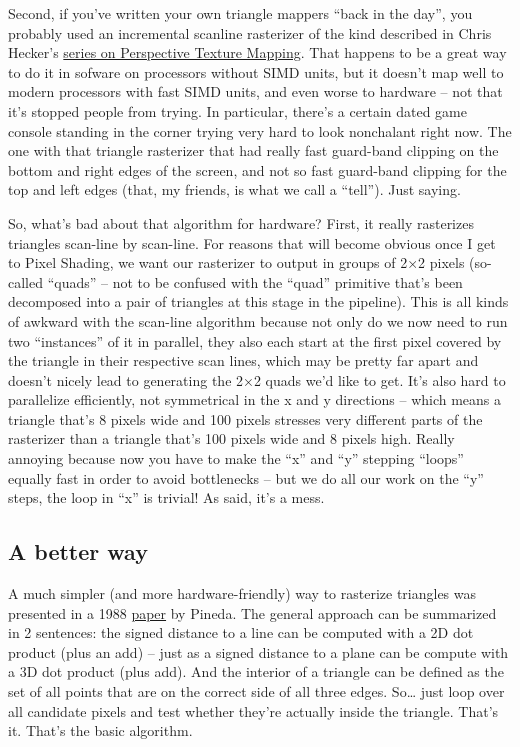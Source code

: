 \documentclass[12pt]{article}
\begin{document}
Second, if you’ve written your own triangle mappers “back in the day”, you probably used an incremental scanline rasterizer of the kind described in Chris Hecker’s \href{http://chrishecker.com/Miscellaneous\_Technical\_Articles}{series on Perspective Texture Mapping}. That happens to be a great way to do it in sofware on processors without SIMD units, but it doesn’t map well to modern processors with fast SIMD units, and even worse to hardware – not that it’s stopped people from trying. In particular, there’s a certain dated game console standing in the corner trying very hard to look nonchalant right now. The one with that triangle rasterizer that had really fast guard-band clipping on the bottom and right edges of the screen, and not so fast guard-band clipping for the top and left edges (that, my friends, is what we call a “tell”). Just saying.

So, what’s bad about that algorithm for hardware? First, it really rasterizes triangles scan-line by scan-line. For reasons that will become obvious once I get to Pixel Shading, we want our rasterizer to output in groups of 2×2 pixels (so-called “quads” – not to be confused with the “quad” primitive that’s been decomposed into a pair of triangles at this stage in the pipeline). This is all kinds of awkward with the scan-line algorithm because not only do we now need to run two “instances” of it in parallel, they also each start at the first pixel covered by the triangle in their respective scan lines, which may be pretty far apart and doesn’t nicely lead to generating the 2×2 quads we’d like to get. It’s also hard to parallelize efficiently, not symmetrical in the x and y directions – which means a triangle that’s 8 pixels wide and 100 pixels stresses very different parts of the rasterizer than a triangle that’s 100 pixels wide and 8 pixels high. Really annoying because now you have to make the “x” and “y” stepping “loops” equally fast in order to avoid bottlenecks – but we do all our work on the “y” steps, the loop in “x” is trivial! As said, it’s a mess.

\subsection{A better way}
\label{sec:orgc99ef1c}

A much simpler (and more hardware-friendly) way to rasterize triangles was presented in a 1988 \href{http://citeseerx.ist.psu.edu/viewdoc/download?doi=10.1.1.157.4621\&rep=rep1\&type=pdf}{paper} by Pineda. The general approach can be summarized in 2 sentences: the signed distance to a line can be computed with a 2D dot product (plus an add) – just as a signed distance to a plane can be compute with a 3D dot product (plus add). And the interior of a triangle can be defined as the set of all points that are on the correct side of all three edges. So… just loop over all candidate pixels and test whether they’re actually inside the triangle. That’s it. That’s the basic algorithm.
\end{document}
